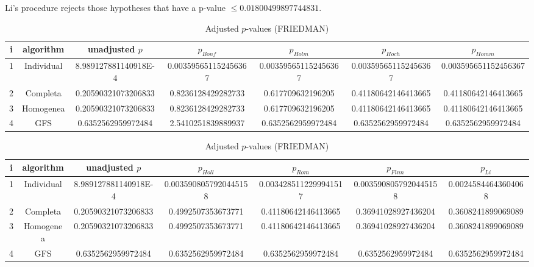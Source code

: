 \documentclass[a4paper,10pt]{article}
\begin{document}
\begin{landscape}
Li's procedure rejects those hypotheses that have a p-value $\le0.01800499897744831$.



\newpage

\begin{table}[!htp]
\centering\scriptsize
\caption{Adjusted $p$-values (FRIEDMAN)}
\begin{tabular}{ccccccc}
i&algorithm&unadjusted $p$&$p_{Bonf}$&$p_{Holm}$&$p_{Hoch}$&$p_{Homm}$\\
\hline
1&Individual&8.989127881140918E-4&0.003595651152456367&0.003595651152456367&0.003595651152456367&0.003595651152456367\\
2&Completa&0.20590321073206833&0.8236128429282733&0.617709632196205&0.41180642146413665&0.41180642146413665\\
3&Homogenea&0.20590321073206833&0.8236128429282733&0.617709632196205&0.41180642146413665&0.41180642146413665\\
4&GFS&0.6352562959972484&2.5410251839889937&0.6352562959972484&0.6352562959972484&0.6352562959972484\\
\hline
\end{tabular}
\end{table}

\begin{table}[!htp]
\centering\scriptsize
\caption{Adjusted $p$-values (FRIEDMAN)}
\begin{tabular}{ccccccc}
i&algorithm&unadjusted $p$&$p_{Holl}$&$p_{Rom}$&$p_{Finn}$&$p_{Li}$\\
\hline
1&Individual&8.989127881140918E-4&0.0035908057920445158&0.0034285112299941517&0.0035908057920445158&0.00245844643604068\\
2&Completa&0.20590321073206833&0.4992507353673771&0.41180642146413665&0.36941028927436204&0.3608241899069089\\
3&Homogenea&0.20590321073206833&0.4992507353673771&0.41180642146413665&0.36941028927436204&0.3608241899069089\\
4&GFS&0.6352562959972484&0.6352562959972484&0.6352562959972484&0.6352562959972484&0.6352562959972484\\
\hline
\end{tabular}
\end{table}


\newpage


\end{landscape}
\end{document}
